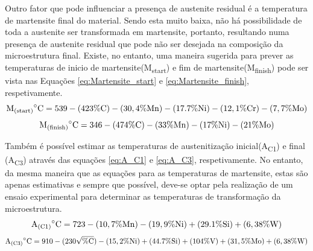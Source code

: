 \par
Outro fator que pode influenciar a presença de austenite residual é a temperatura de martensite final do material. Sendo esta muito baixa, não há possibilidade de toda a austenite ser transformada em martensite, portanto, resultando numa presença de austenite residual que pode não ser desejada na composição da microestrutura final. Existe, no entanto, uma maneira sugerida para prever as temperaturas de inicio de martensite(M\textsubscript{start}) e fim de martensite(M\textsubscript{finish}) pode ser vista nas Equações \ref{eq:Martensite_start} e \ref{eq:Martensite_finish}, respetivamente\cite{Honeycombe1995}.
\begin{equation}
    \label{eq:Martensite_start}
    \mathrm{M\textsubscript{(start)}}^{\circ}\mathrm{C} = 539-(423\%\mathrm{C})-(30,4\%\mathrm{Mn})-(17.7\%\mathrm{Ni})-(12,1\%\mathrm{Cr})-(7,7\%\mathrm{Mo})
\end{equation}
\begin{equation}
    \label{eq:Martensite_finish}
    \mathrm{M\textsubscript{(finish)}}^{\circ}\mathrm{C} = 346 - (474\%\mathrm{C}) - (33\%\mathrm{Mn}) - (17\%\mathrm{Ni}) - (21\%\mathrm{Mo})
\end{equation}
\par
Também é possível estimar as temperaturas de austenitização inicial(A\textsubscript{C1}) e final (A\textsubscript{C3}) através das equações \ref{eq:A_C1} e \ref{eq:A_C3}, respetivamente\cite{Platl2020}. No entanto, da mesma maneira que as equações para as temperaturas de martensite, estas são apenas estimativas e sempre que possível, deve-se optar pela realização de um ensaio experimental para determinar as temperaturas de transformação da microestrutura.
\begin{equation}
    \label{eq:A_C1}
    \mathrm{A\textsubscript{(C1)}}^{\circ}\mathrm{C} = 723 - (10,7\%\mathrm{Mn}) - (19,9\%\mathrm{Ni}) + (29.1\%\mathrm{Si}) + (6,38\%\mathrm{W})
\end{equation}
\begin{equation}
    \label{eq:A_C3}
    \mathrm{A\textsubscript{(C3)}}^{\circ}\mathrm{C} = 910 - (230\sqrt{\%\mathrm{C}}) - (15,2\%\mathrm{Ni}) + (44.7\%\mathrm{Si}) + (104\%\mathrm{V}) + (31,5\%\mathrm{Mo}) + (6,38\%\mathrm{W})
\end{equation}
